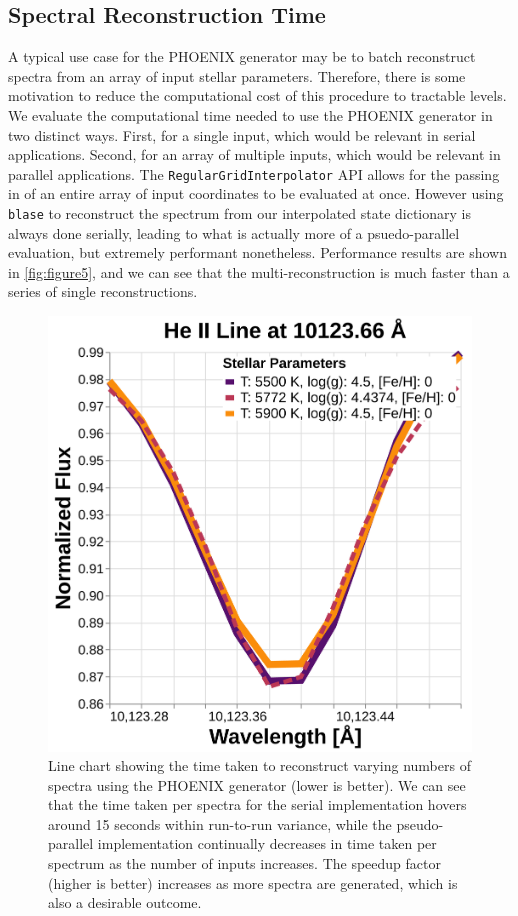 \documentclass[twocolumn]{aastex631}
\begin{document}
\subsection{Spectral Reconstruction Time}
A typical use case for the PHOENIX generator may be to batch reconstruct spectra from an array of input stellar parameters. 
Therefore, there is some motivation to reduce the computational cost of this procedure to tractable levels. 
We evaluate the computational time needed to use the PHOENIX generator in two distinct ways. 
First, for a single input, which would be relevant in serial applications. 
Second, for an array of multiple inputs, which would be relevant in parallel applications.
The \texttt{RegularGridInterpolator} API allows for the passing in of an entire array of input coordinates to be evaluated at once. 
However using \texttt{blase} to reconstruct the spectrum from our interpolated state dictionary is always done serially, leading to what is actually more of a psuedo-parallel evaluation, but extremely performant nonetheless. 
Performance results are shown in \autoref{fig:figure5}, and we can see that the multi-reconstruction is much faster than a series of single reconstructions.

\begin{figure}
    \centering
    \includegraphics[width=\columnwidth]{figure5}
    \caption{Line chart showing the time taken to reconstruct varying numbers of spectra using the PHOENIX generator (lower is better). 
    We can see that the time taken per spectra for the serial implementation hovers around 15 seconds within run-to-run variance, while the pseudo-parallel implementation continually decreases in time taken per spectrum as the number of inputs increases. 
    The speedup factor (higher is better) increases as more spectra are generated, which is also a desirable outcome.}
    \label{fig:figure5}
\end{figure}
\end{document}
